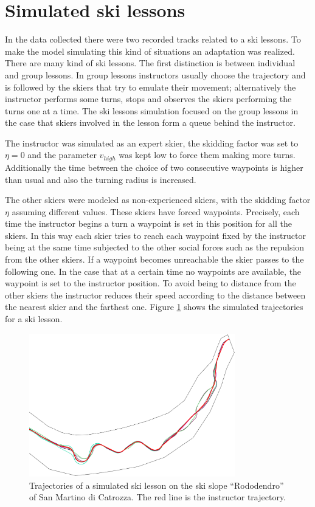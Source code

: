 \documentclass[12pt,a4paper,twoside]{book}
\begin{document}
\section{Simulated ski lessons}\label{ski_lessons}
In the data collected there were two recorded tracks related to a ski lessons. To make the model simulating this kind of situations an adaptation was realized. There are many kind of ski lessons. The first distinction is between individual and group lessons. In group lessons instructors usually choose the trajectory and is followed by the skiers that try to emulate their movement; alternatively the instructor performs some turns, stops and observes the skiers performing the turns one at a time. The ski lessons simulation focused on the group lessons in the case that skiers involved in the lesson form a queue behind the instructor.

The instructor was simulated as an expert skier, the skidding factor was set to $\eta=0$ and the parameter ${v_{high}}$ was kept low to force them making more turns. Additionally the time between the choice of two consecutive waypoints is higher than usual and also the turning radius is increased.

The other skiers were modeled as non-experienced skiers, with the skidding factor $\eta$ assuming different values. These skiers have forced waypoints. Precisely, each time the instructor begins a turn a waypoint is set in this position for all the skiers. In this way each skier tries to reach each waypoint fixed by the instructor being at the same time subjected to the other social forces such as the repulsion from the other skiers. If a waypoint becomes unreachable the skier passes to the following one. In the case that at a certain time no waypoints are available, the waypoint is set to the instructor position. To avoid being to distance from the other skiers the instructor reduces their speed according to the distance between the nearest skier and the farthest one. Figure \ref{lesson} shows the simulated trajectories for a ski lesson.

\begin{figure}
  \centering
    \includegraphics[width=0.8\textwidth]{images/lesson.eps}
    \caption{Trajectories of a simulated ski lesson on the ski slope ``Rododendro'' of San Martino di Catrozza. The red line is the instructor trajectory.}\label{lesson}
\end{figure}
\end{document}
